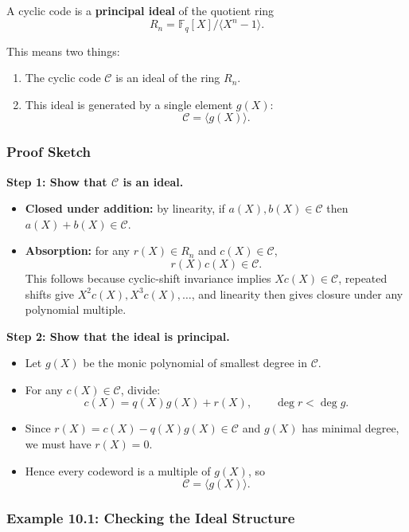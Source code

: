 \documentclass[11pt,oneside]{book}
\providecommand{\tightlist}{\setlength{\itemsep}{0pt}\setlength{\parskip}{0pt}}
\theoremstyle{plain}
\theoremstyle{definition}
\theoremstyle{remark}
\begin{document}
A cyclic code is a \textbf{principal ideal} of the quotient ring
\[R_n = \mathbb{F}_q[X]/\langle X^n-1 \rangle.\]

This means two things:

\begin{enumerate}
\def\labelenumi{\arabic{enumi}.}
\tightlist
\item
  The cyclic code \(\mathcal{C}\) is an ideal of the ring \(R_n\).
\item
  This ideal is generated by a single element \(g(X)\):
  \[\mathcal{C}=\langle g(X) \rangle.\]
\end{enumerate}

\subsubsection{Proof Sketch}\label{proof-sketch}

\textbf{Step 1: Show that \(\mathcal{C}\) is an ideal.}

\begin{itemize}
\tightlist
\item
  \textbf{Closed under addition:} by linearity, if
  \(a(X),b(X)\in\mathcal{C}\) then \(a(X)+b(X)\in\mathcal{C}\).
\item
  \textbf{Absorption:} for any \(r(X)\in R_n\) and
  \(c(X)\in\mathcal{C}\), \[r(X)c(X)\in \mathcal{C}.\] This follows
  because cyclic-shift invariance implies \(Xc(X)\in\mathcal{C}\),
  repeated shifts give \(X^2c(X),X^3c(X),\dots\), and linearity then
  gives closure under any polynomial multiple.
\end{itemize}

\textbf{Step 2: Show that the ideal is principal.}

\begin{itemize}
\tightlist
\item
  Let \(g(X)\) be the monic polynomial of smallest degree in
  \(\mathcal{C}\).
\item
  For any \(c(X)\in\mathcal{C}\), divide:
  \[c(X)=q(X)g(X)+r(X), \qquad \deg r < \deg g.\]
\item
  Since \(r(X)=c(X)-q(X)g(X)\in\mathcal{C}\) and \(g(X)\) has minimal
  degree, we must have \(r(X)=0\).
\item
  Hence every codeword is a multiple of \(g(X)\), so
  \[\mathcal{C}=\langle g(X) \rangle.\]
\end{itemize}

\subsubsection{Example 10.1: Checking the Ideal
Structure}\label{example-10.1-checking-the-ideal-structure}
\end{document}

